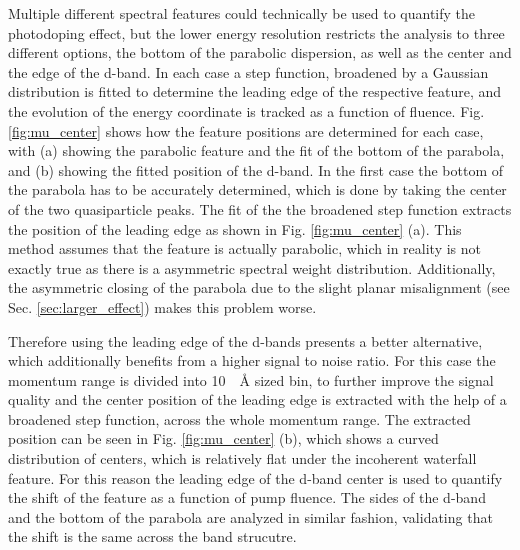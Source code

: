 Multiple different spectral features could technically be used to quantify the photodoping effect, but the lower energy resolution restricts the analysis to three different options, the bottom of the parabolic dispersion, as well as the center and the edge of the  d-band.
In each case a step function, broadened by a Gaussian distribution is fitted to determine the leading edge of the respective feature, and the evolution of the energy coordinate is tracked as a function of fluence.
Fig. \ref{fig:mu_center} shows how the feature positions are determined for each case, with (a) showing the parabolic feature and the fit of the bottom of the parabola, and (b) showing the fitted position of the  d-band.
In the first case the bottom of the parabola has to be accurately determined, which is done by taking the center of the two quasiparticle peaks.
The fit of the the broadened step function extracts the position of the leading edge as shown in Fig. \ref{fig:mu_center} (a).
This method assumes that the feature is actually parabolic, which in reality is not exactly true as there is a asymmetric spectral weight distribution.
Additionally, the asymmetric closing of the parabola due to the slight planar misalignment (see Sec. \ref{sec:larger_effect}) makes this problem worse.

Therefore using the leading edge of the  d-bands presents a better alternative, which additionally benefits from a higher signal to noise ratio.
For this case the momentum range is divided into \qty{10}{\per\angstrom} sized bin, to further improve the signal quality and the center position of the leading edge is extracted with the help of a broadened step function, across the whole momentum range.
The extracted position can be seen in Fig. \ref{fig:mu_center} (b), which shows a curved distribution of centers, which is relatively flat under the incoherent waterfall feature.
For this reason the leading edge of the  d-band center is used to quantify the shift of the feature as a function of pump fluence.
The sides of the  d-band and the bottom of the parabola are analyzed in similar fashion, validating that the shift is the same across the band strucutre.

